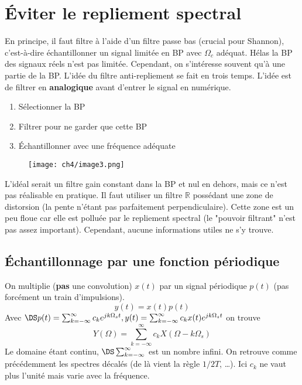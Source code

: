 	
\section{Éviter le repliement spectral}
En principe, il faut filtre à l'aide d'un filtre passe bas (crucial pour Shannon), c'est-à-dire 
échantillonner un signal limitée en BP avec $\Omega_c$ adéquat. Hélas la BP des signaux réels n'est 
pas limitée. Cependant, on s'intéresse souvent qu'à une partie de la BP. L'idée du filtre 
anti-repliement se fait en trois temps. L'idée est de filtrer en \textbf{analogique} avant d'entrer 
le signal en numérique.
\begin{enumerate}
\item Sélectionner la BP
\item Filtrer pour ne garder que cette BP
\item Échantillonner avec une fréquence adéquate
\end{enumerate}
\newpage

	\begin{wrapfigure}[10]{l}{7cm}
	\texttt{[image: ch4/image3.png]}
	\end{wrapfigure}	
L'idéal serait un filtre gain constant dans la BP et nul en dehors, mais ce n'est pas réalisable 
en pratique. Il faut utiliser un filtre $\mathbb{R}$ possédant une zone de distorsion (la pente 
n'étant pas parfaitement perpendiculaire). Cette zone est un peu floue car elle est polluée par 
le repliement spectral (le "pouvoir filtrant" n'est pas assez important). Cependant, aucune informations 
utiles ne s'y trouve. 

	\subsection{Échantillonnage par une fonction périodique}
	On multiplie (\textbf{pas} une convolution) $x(t)$ par un signal périodique $p(t)$ (pas 
	forcément un train d'impulsions).
	\begin{equation}
	y(t) = x(t)p(t)
	\end{equation}
	Avec $\DS p(t) = \sum_{k=-\infty}^\infty c_ke^{jk\Omega_st}, y(t) =  \sum_{k=-\infty}^\infty 
	c_kx(t)e^{jk\Omega_st}$ on trouve
	\begin{equation}
	Y(\Omega) = \sum_{k=-\infty}^\infty c_k X(\Omega-k\Omega_s)
	\end{equation}
	Le domaine étant continu, $\DS \sum_{k=-\infty}^\infty$ est un nombre infini. On retrouve 
	comme précédemment les spectres décalés (de là vient la règle $1/2T$, \dots). Ici $c_k$ ne 
	vaut plus l'unité mais varie avec la fréquence.
	

